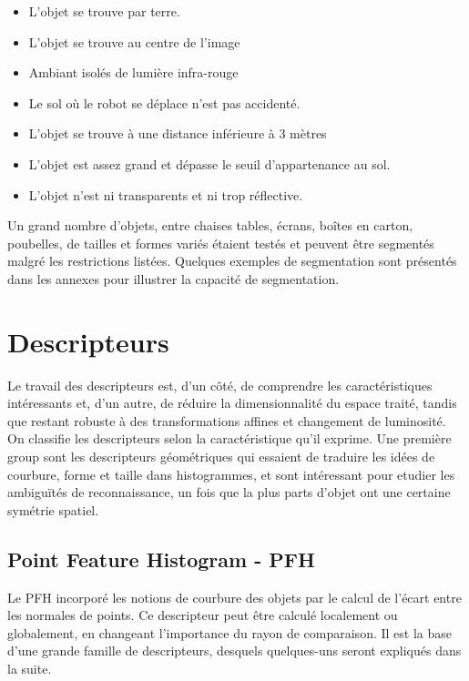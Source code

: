 \begin{itemize}

\item L'objet se trouve par terre.

\item L'objet se trouve au centre de l'image
\item Ambiant isolés de lumière infra-rouge 

\item Le sol où le robot se déplace n'est pas accidenté.


\item L'objet se trouve à une distance inférieure à 3 mètres 


\item L'objet est assez grand et dépasse le seuil d'appartenance au
sol.

\item L'objet n'est ni transparents et ni trop réflective.

\end{itemize}

Un grand nombre d'objets, entre chaises tables, écrans, boîtes en
carton, poubelles, de tailles et formes variés étaient testés et
peuvent être segmentés malgré les restrictions listées. Quelques
exemples de segmentation sont présentés dans les annexes pour illustrer
la capacité de segmentation.

\section{Descripteurs}

Le travail des descripteurs est, d'un côté, de comprendre les
caractéristiques intéressants et, d'un autre, de réduire la
dimensionnalité du espace traité, tandis que restant robuste à des
transformations affines et changement de luminosité. On classifie les
descripteurs selon la caractéristique qu'il exprime. Une première
group sont les descripteurs géométriques qui essaient de traduire les
idées de courbure, forme et taille dans histogrammes, et sont intéressant
 pour etudier les ambiguïtés de reconnaissance, un fois que la plus parts 
 d'objet ont une certaine symétrie spatiel.

\subsection{Point Feature Histogram - PFH}

Le PFH incorporé les notions de courbure des objets par le calcul de
l'écart entre les normales de points. Ce descripteur peut être calculé
localement ou globalement, en changeant l'importance du rayon de
comparaison. Il est la base d'une grande famille de descripteurs, desquels
quelques-uns seront expliqués dans la suite.

